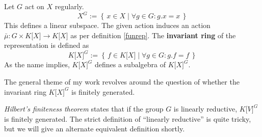 \begin{definition}[Invariants]
  Let $ G $ act on $ X $ regularly.
  \begin{equation}
    X^G := \left\{\, x \in X \mid \forall g \in G : g . x = x \,\right\}
  \end{equation}
  This defines a linear subspace.
  The given action induces an action $ \bar{\mu} \colon G \times K\lbrack X\rbrack \longrightarrow K\lbrack X\rbrack $ as per definition \ref{funrep}.
  The \textbf{invariant ring} of the representation is defined as
  \begin{equation}
    K\lbrack X\rbrack^G := \left\{ \, f \in K\lbrack X \rbrack \mid \forall g \in G : g . f = f \, \right\}
  \end{equation}
  As the name implies, $ K\lbrack X\rbrack^G $ defines a subalgebra of $ K\lbrack X\rbrack^G $.
\end{definition}

The general theme of my work revolves around the question of whether the invariant ring $ K\lbrack X\rbrack^G $ is finitely generated.

\textit{Hilbert's finiteness theorem} states that if the group $G$ is linearly reductive, $ K\lbrack V\rbrack^G $ is finitely generated.
The strict definition of ``linearly reductive'' is quite tricky, but we will give an alternate equivalent definition shortly.

